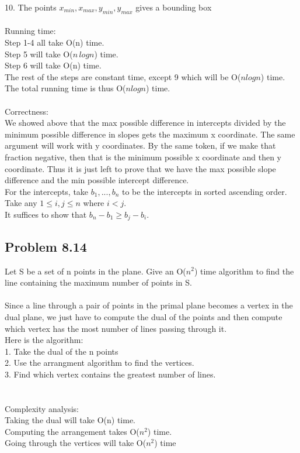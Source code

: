 \documentclass[11pt,psfig]{article}
\begin{document}
10. The points $x_{min},x_{max},y_{min},y_{max}$ gives a bounding box\\
\\
Running time:\\
Step 1-4 all take O(n) time.\\
Step 5 will take O($n \, log n$) time. \\
Step 6 will take O(n) time. \\
The rest of the steps are constant time, except 9 which will be O($n log n$) time. \\
The total running time is thus O($n log n$) time. \\
\\
Correctness:\\
We showed above that the max possible difference in intercepts divided by the minimum possible difference in slopes gets the maximum x coordinate. The same argument will work with y coordinates. By the same token, if we make that fraction negative, then that is the minimum possible x coordinate and then y coordinate. Thus it is just left to prove that we have the max possible slope difference and the min possible intercept difference. \\
For the intercepts, take $b_1,...,b_n$ to be the intercepts in sorted ascending order. \\Take any $1 \leq i,j \leq n$ where $i < j$. \\It suffices to show that $b_n - b_1 \geq b_j - b_i$. \\


\subsection*{Problem 8.14}

Let S be a set of n points in the plane. Give an O($n^2$) time algorithm to
find the line containing the maximum number of points in S.
\\
\\
Since a line through a pair of points in the primal plane becomes a vertex in the dual plane, we just have to compute the dual of the points and then compute which vertex has the most number of lines passing through it. 
\\
Here is the algorithm:\\
1. Take the dual of the n points\\
2. Use the arrangment algorithm to find the vertices. \\
3. Find which vertex contains the greatest number of lines. \\
\\
\\
Complexity analysis:\\
Taking the dual will take O(n) time. \\
Computing the arrangement takes O($n^2$) time. \\
Going through the vertices will take O($n^2$) time


\end{document}
